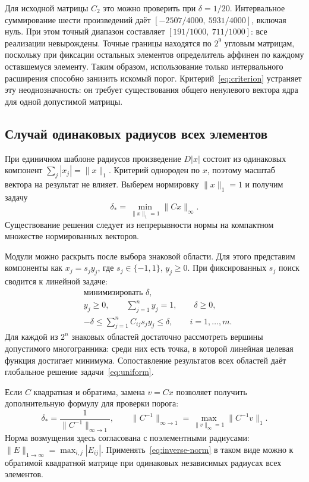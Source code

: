 \documentclass[12pt,a4paper]{article}
\begin{document}
Для исходной матрицы $C_2$ это можно проверить при $\delta=1/20$.
Интервальное суммирование шести произведений даёт
$[-2507/4000,\ 5931/4000]$, включая нуль. При этом точный диапазон
составляет $[191/1000,\ 711/1000]$: все реализации невырождены.
Точные границы находятся по $2^9$ угловым матрицам, поскольку
при фиксации остальных элементов определитель аффинен по каждому
оставшемуся элементу. Таким образом, использование только
интервального расширения способно занизить искомый порог.
Критерий~\eqref{eq:criterion} устраняет эту неоднозначность:
он требует существования общего ненулевого вектора ядра
для одной допустимой матрицы.

\subsection{Случай одинаковых радиусов всех элементов}

При единичном шаблоне радиусов произведение $D|x|$ состоит
из одинаковых компонент $\sum_j|x_j|=\|x\|_1$.
Критерий однороден по $x$, поэтому масштаб вектора на результат
не влияет. Выберем нормировку $\|x\|_1=1$ и получим задачу
\begin{equation}
\delta_*=\min_{\|x\|_1=1}\|Cx\|_\infty.
\label{eq:uniform}
\end{equation}
Существование решения следует из непрерывности нормы на компактном
множестве нормированных векторов.

Модули можно раскрыть после выбора знаковой области.
Для этого представим компоненты как $x_j=s_jy_j$, где
$s_j\in\{-1,1\}$, $y_j\geq0$. При фиксированных $s_j$
поиск сводится к линейной задаче:
\begin{equation}
\begin{aligned}
&\text{минимизировать } \delta,\\
&y_j\geq0,\qquad \sum_{j=1}^{n}y_j=1,\qquad \delta\geq0,\\
&-\delta\leq\sum_{j=1}^{n}C_{ij}s_jy_j\leq\delta,
\qquad i=1,\ldots,m.
\end{aligned}
\label{eq:lp}
\end{equation}
Для каждой из $2^n$ знаковых областей достаточно рассмотреть
вершины допустимого многогранника: среди них есть точка,
в которой линейная целевая функция достигает минимума.
Сопоставление результатов всех областей даёт глобальное решение
задачи~\eqref{eq:uniform}.

Если $C$ квадратная и обратима, замена $v=Cx$ позволяет получить
дополнительную формулу для проверки порога:
\begin{equation}
\delta_*=
\frac{1}{\|C^{-1}\|_{\infty\to1}},
\qquad
\|C^{-1}\|_{\infty\to1}
=\max_{\|v\|_\infty=1}\|C^{-1}v\|_1.
\label{eq:inverse-norm}
\end{equation}
Норма возмущения здесь согласована с поэлементными радиусами:
$\|E\|_{1\to\infty}=\max_{i,j}|E_{ij}|$.
Применять~\eqref{eq:inverse-norm} в таком виде можно к обратимой
квадратной матрице при одинаковых независимых радиусах всех элементов.
\end{document}
